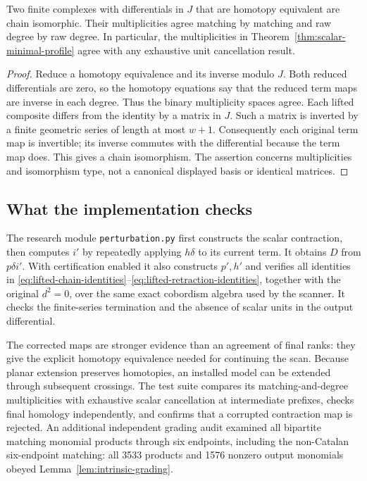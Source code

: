 \begin{lemma}
\label{lem:minimal-uniqueness}
Two finite complexes with differentials in $J$ that are homotopy equivalent
are chain isomorphic.  Their multiplicities agree matching by matching and
raw degree by raw degree.  In particular, the multiplicities in
Theorem~\ref{thm:scalar-minimal-profile} agree with any exhaustive unit
cancellation result.
\end{lemma}

\begin{proof}
Reduce a homotopy equivalence and its inverse modulo $J$.  Both reduced
differentials are zero, so the homotopy equations say that the reduced
term maps are inverse in each degree.  Thus the binary multiplicity spaces
agree.  Each lifted composite differs from the identity by a matrix in
$J$.  Such a matrix is inverted by a finite geometric series of length
at most $w+1$.  Consequently each original term map is invertible; its
inverse commutes with the differential because the term map does.  This
gives a chain isomorphism.  The assertion concerns multiplicities and
isomorphism type, not a canonical displayed basis or identical matrices.
\end{proof}

\subsection{What the implementation checks}

The research module \texttt{perturbation.py} first constructs the scalar
contraction, then computes $i'$ by repeatedly applying $h\delta$ to its
current term.  It obtains $D$ from $p\delta i'$.  With certification enabled
it also constructs $p',h'$ and verifies all identities in
\eqref{eq:lifted-chain-identities}--\eqref{eq:lifted-retraction-identities},
together with the original $d^2=0$, over the same exact cobordism algebra
used by the scanner.  It checks the finite-series termination and the
absence of scalar units in the output differential.

The corrected maps are stronger evidence than an agreement of final ranks:
they give the explicit homotopy equivalence needed for continuing the scan.
Because planar extension preserves homotopies, an installed model can be
extended through subsequent crossings.  The test suite compares its
matching-and-degree multiplicities with exhaustive scalar cancellation at
intermediate prefixes, checks final homology independently, and confirms
that a corrupted contraction map is rejected.  An additional independent
grading audit examined all bipartite matching monomial products through
six endpoints, including the non-Catalan six-endpoint matching: all 3533
products and 1576 nonzero output monomials obeyed
Lemma~\ref{lem:intrinsic-grading}.

